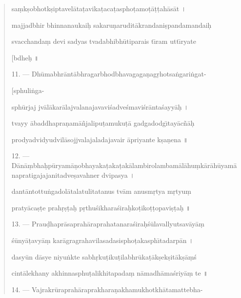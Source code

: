 \documentclass[a4paper, 11pt, oneside, french, landscape, twocolumn]{article}
\begin{document}
\begin{quotation}
sa\d{m}k\d{s}obhotk\d{s}iptavel\={a}ta\d{t}avika\d{t}aca\d{t}aspho\d{t}amo\d{t}\={a}\d{t}\d{t}ah\={a}s\={a}t \texthindi{।}

majjadbhir bhinnanaukai\d{h} sakaru\d{n}arudit\={a}krandani\d{s}pandamandai\d{h}

svacchanda\d{m} devi sadyas tvadabhibh\={u}tiparais t\={\i}ram utt\={\i}ryate

\hspace*{55mm}[bdhe\d{h} \texthindi{॥}

\bigskip

11. --- Dh\={u}mabhr\={a}nt\={a}bhragarbhodbhavagaga\d{n}ag\d{r}hotsa\.{n}gari\.{n}gat-

\hspace*{55mm}[sphuli\.{n}ga-

sph\={u}rjaj jv\={a}l\={a}kar\={a}lajvalanajavavi\'{s}adve\'{s}mavi\'{s}r\={a}nta\'{s}ayy\={a}\d{h} \texthindi{।}

tvayy \={a}baddhapra\d{n}am\={a}\~{n}jalipu\d{t}amuku\d{t}\={a} gadgadodg\={\i}tay\={a}c\~{n}\={a}\d{h}

prodyadvidyudvil\={a}sojjvalajaladajavair \={a}priyante k\d{s}a\d{n}ena \texthindi{॥}

\bigskip

12. --- D\={a}n\={a}\d{m}bha\d{h}p\={u}ryam\={a}\d{n}obhayaka\d{t}aka\d{t}ak\={a}lambirolambam\={a}l\={a}hu\d{m}k\={a}r\={a}h\={u}yam\={a}napratigajajanitadve\d{s}avahner dvipasya \texthindi{।}

dant\={a}ntottu\.{n}gadol\={a}talatulitatanus tv\={a}m anusm\d{r}tya m\d{r}tyu\d{m}

praty\={a}ca\d{s}\d{t}e prah\d{r}\d{s}\d{t}a\d{h} p\d{r}thu\'{s}ikhara\'{s}ira\d{h}ko\d{t}iko\d{t}\d{t}opavi\d{s}\d{t}a\d{h} \texthindi{॥}

\bigskip

13. --- Prau\d{d}hapr\={a}saprah\={a}raprahatanara\'{s}ira\d{h}\'{s}\={u}lavallyutsav\={a}y\={a}\d{m}

\'{s}\={u}ny\={a}\d{t}avy\={a}\d{m} kar\={a}gragrahavilasadasispho\d{t}akasph\={\i}tadarp\={a}n \texthindi{।}

dasy\={u}n d\={a}sye niyu\.{n}kte sabh\d{r}ku\d{t}iku\d{t}ilabhr\={u}ka\d{t}\={a}k\d{s}ek\d{s}it\={a}k\d{s}\={a}\d{m}\'{s}

cint\={a}lekhany akhinnasphu\d{t}alikhitapada\d{m} n\={a}madh\={a}ma\'{s}riy\={a}\d{m} te \texthindi{॥}

\bigskip

14. --- Vajrakr\={u}raprah\={a}raprakhara\d{n}akhamukhotkh\={a}tamattebha-


\end{quotation}
\end{document}
